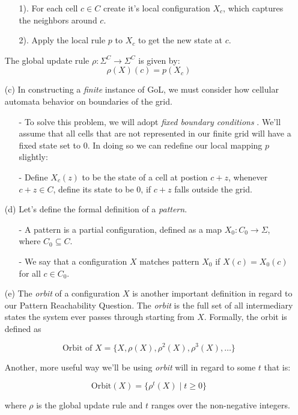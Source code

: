 \documentclass{article}
\theoremstyle{definition}
\theoremstyle{plain}
\theoremstyle{plain}
\begin{document}
\begin{enumerate}
        \begin{enumerate}
          \item[1).] For each cell $c \in C$ create it's local configuration $X_c$, which captures the neighbors around $c$.
          \item[2).] Apply the local rule $p$ to $X_c$ to get the new state at $c$.
        \end{enumerate}
        The global update rule $\rho : \Sigma^C \to \Sigma^C$ is  given by:
        \begin {equation}
        \rho(X)(c) = p(X_c)
        \end {equation}
      \item[(c)] In constructing a \textit{finite} instance of GoL, we must consider how cellular automata behavior on boundaries of the grid.
        \begin{enumerate}
          \item[-] To solve this problem, we will adopt \textit{fixed boundary conditions} \cite{SUTNER199587}. We'll assume that all cells that are not represented in our finite grid will have a fixed state set to $0$. In doing so we can redefine our local mapping $p$ slightly: 
          \item[-] Define $X_c(z)$ to be the state of a cell at postion $c + z$, whenever $c + z \in C$, define its state to be 0, if $c + z$ falls outside the grid.
        \end{enumerate}
      \item[(d)] Let's define the formal definition of a \textit{pattern}. \cite{SUTNER199587}
        \begin{enumerate}
           \item[-] A pattern is a partial configuration, defined as a map $X_0: C_0 \to \Sigma$, where $C_0 \subseteq C$.
    \item[-] We say that a configuration $X$ matches pattern $X_0$ if $X(c) = X_0(c)$ for all $c \in C_0$.
        \end{enumerate}

\item[(e)] The \textit{orbit} of a configuration $X$ is another important definition in regard to our Pattern Reachability Question. The \textit{orbit} is the full set of all intermediary states the system ever passes through starting from $X$. Formally, the orbit is defined as

\begin{equation}
  \text{Orbit of } X = \{ X, \rho(X), \rho^2(X), \rho^3(X), \dots \}
\end{equation}

Another, more useful way we'll be using \textit{orbit} will in regard to some $t$ that is: 

\begin{equation}
\text{Orbit}(X) = \{ \rho^t(X) \mid t \geq 0 \}
\end{equation}

where \( \rho \) is the global update rule and \( t \) ranges over the non-negative integers.
\end{enumerate}
\end{document}
